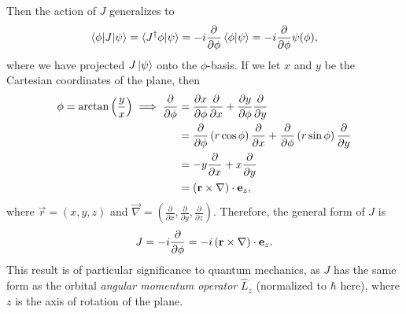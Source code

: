 
Then the action of $J$ generalizes to
\begin{align*}
    \braket{\phi|J|\psi} = \braket{J^\dagger \phi|\psi} = -i\frac{\partial}{\partial\phi}\braket{\phi|\psi} = -i\frac{\partial}{\partial\phi}\psi(\phi),
\end{align*}
where we have projected $J\ket{\psi}$ onto the $\phi$-basis. If we let $x$ and $y$ be the Cartesian coordinates of the plane, then
\begin{align*}
    \phi = \arctan\left(\frac{y}{x}\right) \implies \frac{\partial}{\partial\phi} 
        &= \frac{\partial x}{\partial \phi}\frac{\partial}{\partial x} + \frac{\partial y}{\partial \phi}\frac{\partial}{\partial y} \\
        &= \frac{\partial}{\partial\phi}\left( r\cos\phi \right)\frac{\partial}{\partial x} + \frac{\partial}{\partial\phi}\left( r\sin\phi \right)\frac{\partial}{\partial y} \\
        &= -y\frac{\partial}{\partial x} + x\frac{\partial}{\partial y} \\
        &= (\mathbf{r}\times\mathbf{\nabla})\cdot\mathbf{e}_z,
\end{align*}
where $\vec{r} = (x,y,z)$ and $\vec{\nabla} = \left(\frac{\partial}{\partial x},\frac{\partial}{\partial y},\frac{\partial}{\partial z}\right)$. Therefore, the general form of $J$ is
\begin{align}\label{eq:SO2_J}
    J = -i \frac{\partial}{\partial\phi} = -i \left( \mathbf{r}\times\mathbf{\nabla} \right)\cdot\mathbf{e}_z.
\end{align}
This result is of particular significance to quantum mechanics, as $J$ has the same form as the orbital \textit{angular momentum operator} $\hat{L}_z$ (normalized to $\hbar$ here), where $z$ is the axis of rotation of the plane\cite{Hall2013,Griffiths2018}.


